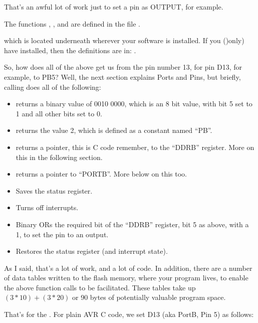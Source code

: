 That's an awful lot of work just to set a pin as OUTPUT, for example.

The functions , ,  and  are defined in the file .

which is located underneath wherever your  software is installed. If you ()only) have  installed, then the definitions are in: .

So, how does all of the above get us from the pin number 13, for pin D13, for example, to PB5? Well, the next section explains Ports and Pins, but briefly, calling  does all of the following:

\begin{itemize}
	\item {} returns a binary value of 0010 0000, which is an 8 bit value, with bit 5 set to 1 and all other bits set to 0.
	\item {} returns the value 2, which is defined as a constant named ``PB''.
	\item {} returns a pointer, this is C code remember, to the ``DDRB'' register. More on this in the following section.
	\item {} returns a pointer to ``PORTB''. More below on this too.
	\item Saves the status register.
	\item Turns off interrupts.
	\item Binary ORs the required bit of the ``DDRB'' register, bit 5 as above, with a 1, to set the pin to an output.
	\item Restores the status register (and interrupt state).
\end{itemize}

As I said, that's a lot of work, and a lot of code. In addition, there are a number of data tables written to the flash memory, where your program lives, to enable the above function calls to be facilitated. These tables take up $(3 * 10) + (3 * 20)$ or 90 bytes of potentially valuable program space.

That's for the . For plain AVR C code, we set D13 (aka PortB, Pin 5) as follows:

